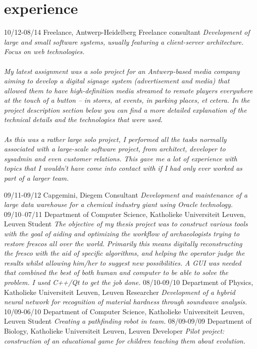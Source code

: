 \documentclass[]{friggeri-cv}
\begin{document}
\section{experience}

\begin{entrylist}
  \entry
    {10/12-08/14}
    {Freelance, Antwerp-Heidelberg}
    {Freelance consultant}
    {\emph{Development of large and small software systems, usually featuring a client-server architecture. Focus on web technologies. \\\\ My latest assignment was a solo project for an Antwerp-based media company aiming to develop a digital signage system (advertisement and media) that allowed them to have high-definition media streamed to remote players everywhere at the touch of a button -- in stores, at events, in parking places, et cetera. In the project description section below you can find a more detailed explanation of the technical details and the technologies that were used. \\\\ As this was a rather large solo project, I performed all the tasks normally associated with a large-scale software project, from architect, developer to sysadmin and even customer relations. This gave me a lot of experience with topics that I wouldn't have come into contact with if I had only ever worked as part of a larger team.
    }}
\end{entrylist}


\begin{entrylist}
  \entry
    {09/11-09/12}
    {Capgemini, Diegem}
    {Consultant}
    {\emph{Development and maintenance of a large data warehouse for a chemical industry giant using Oracle technology.}}
  \entry
    {09/10--07/11}
    {Department of Computer Science, Katholieke Universiteit Leuven, Leuven}
    {Student}
    {\emph{The objective of my thesis project was to construct various tools with the goal of aiding and optimizing the workflow of archaeologists trying to restore frescos all over the world. Primarily this means digitally reconstructing the fresco with the aid of specific algorithms, and helping the operator judge the results whilst allowing him/her to suggest new possibilities. A GUI was needed that combined the best of both human and computer to be able to solve the problem. I used C++/Qt to get the job done.}}
  \entry
    {08/10-09/10}
    {Department of Physics, Katholieke Universiteit Leuven, Leuven}
    {Researcher}
    {\emph{Development of a hybrid neural network for recognition of material hardness through soundwave analysis.}}
  \entry
    {10/09-06/10}
    {Department of Computer Science, Katholieke Universiteit Leuven, Leuven}
    {Student}
    {\emph{Creating a pathfinding robot in team.}}
  \entry
    {08/09-09/09}
    {Department of Biology, Katholieke Universiteit Leuven, Leuven}
    {Developer}
    {\emph{Pilot project: construction of an educational game for children teaching them about evolution.}}
\end{entrylist}
\end{document}
